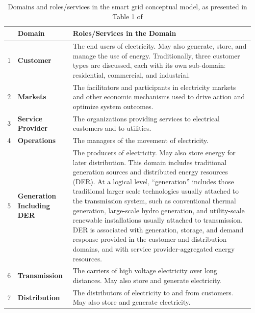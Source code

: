 \begin{table}[t]
    \centering
 
    \begin{tabular}{|p{0.3cm}|p{2.2cm}|p{9.1cm}|}
   \hline

 &\textbf{Domain} & \textbf{Roles/Services in the Domain} \\ \hline
 
1 & \textbf{Customer} & The end users of electricity. May also generate, store, and manage the use of energy. Traditionally, three customer types are discussed, each with its own sub-domain: residential, commercial, and industrial. \\ \hline
2 & \textbf{Markets} & The facilitators and participants in electricity markets and other economic mechanisms used to drive action and optimize system outcomes. \\ \hline
3 & \textbf{Service Provider} & The organizations providing services to electrical customers and to utilities. \\ \hline
4 & \textbf{Operations} & The managers of the movement of electricity. \\ \hline
5 & \textbf{Generation Including DER} & The producers of electricity. May also store energy for later distribution. This domain includes traditional generation sources and distributed energy resources (DER). At a logical level, “generation” includes those traditional larger scale technologies usually attached to the transmission system, such as conventional thermal generation, large-scale hydro generation, and utility-scale renewable installations usually attached to transmission. DER is associated with generation, storage, and demand response provided in the customer and distribution domains, and with service provider-aggregated energy resources. \\ \hline
6 & \textbf{Transmission} & The carriers of high voltage electricity over long distances. May also store and generate electricity. \\ \hline
7 & \textbf{Distribution} & The distributors of electricity to and from customers. May also store and generate electricity.\\
    \hline


    
    \end{tabular}

    \caption[Domains and roles/services in the smart grid conceptual model]{Domains and roles/services in the smart grid conceptual model, as presented in Table 1 of }
    \label{tab:nistCMdoains}
\end{table}









